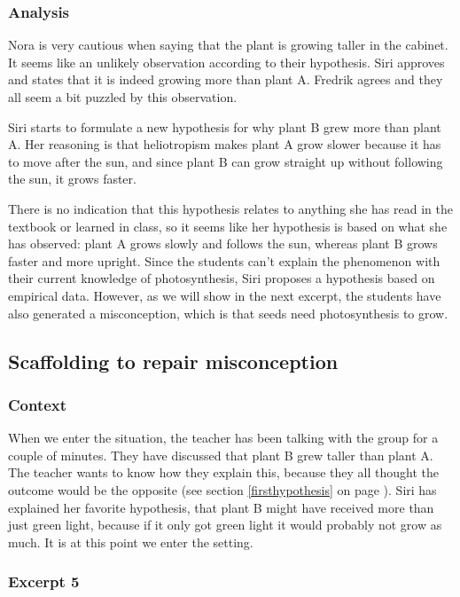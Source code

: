 \subsubsection*{Analysis}
Nora is very cautious when saying that the plant is growing taller in the cabinet. It seems like an unlikely observation according to their hypothesis. Siri approves and states that it is indeed growing more than plant A. Fredrik agrees and they all seem a bit puzzled by this observation.

Siri starts to formulate a new hypothesis for why plant B grew more than plant A. Her reasoning is that heliotropism makes plant A grow slower because it has to move after the sun, and since plant B can grow straight up without following the sun, it grows faster. 

There is no indication that this hypothesis relates to anything she has read in the textbook or learned in class, so it seems like her hypothesis is based on what she has observed: plant A grows slowly and follows the sun, whereas plant B grows faster and more upright. Since the students can't explain the phenomenon with their current knowledge of photosynthesis, Siri proposes a hypothesis based on empirical data. However, as we will show in the next excerpt, the students have also generated a misconception, which is that seeds need photosynthesis to grow.


\subsection{Scaffolding to repair misconception}

\subsubsection*{Context}
When we enter the situation, the teacher has been talking with the group for a couple of minutes. They have discussed that plant B grew taller than plant A. The teacher wants to know how they explain this, because they all thought the outcome would be the opposite (see section \ref{firsthypothesis} on page \pageref{firsthypothesis}). Siri has explained her favorite hypothesis, that plant B might have received more than just green light, because if it only got green light it would probably not grow as much.  It is at this point we enter the setting.
 
\subsubsection*{Excerpt 5}\label{ex:excerpt5}

